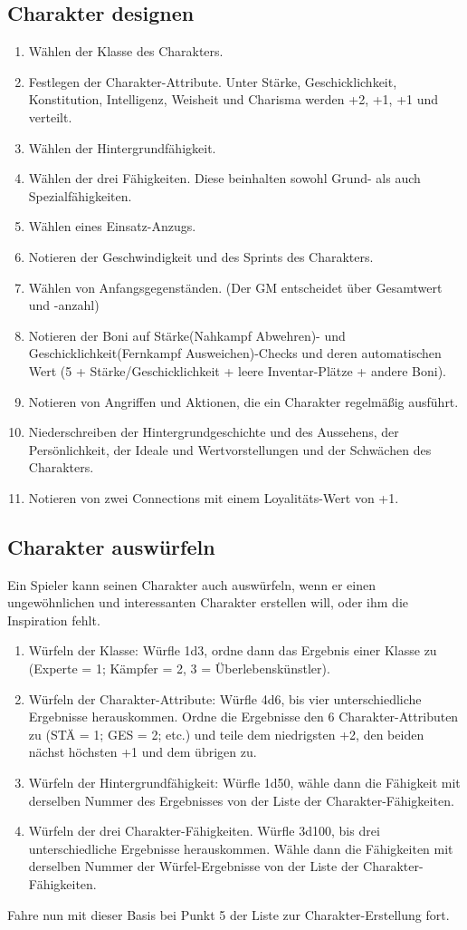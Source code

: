 \subsection{Charakter designen}
\begin{enumerate}
\item Wählen der Klasse des Charakters.
\item Festlegen der Charakter-Attribute. Unter Stärke, Geschicklichkeit, Konstitution, Intelligenz, Weisheit und Charisma werden \glqq +2\grqq{}, \glqq +1\grqq{}, \glqq +1\grqq{} und \grqq{} verteilt.
\item Wählen der Hintergrundfähigkeit.
\item Wählen der drei Fähigkeiten. Diese beinhalten sowohl Grund- als auch Spezialfähigkeiten.
\item Wählen eines Einsatz-Anzugs.
\item Notieren der Geschwindigkeit und des Sprints des Charakters.
\item Wählen von Anfangsgegenständen. (Der GM entscheidet über Gesamtwert und -anzahl)
\item Notieren der Boni auf Stärke(Nahkampf Abwehren)- und Geschicklichkeit(Fernkampf Ausweichen)-Checks und deren automatischen Wert (5 + Stärke/Geschicklichkeit + leere Inventar-Plätze + andere Boni).
\item Notieren von Angriffen und Aktionen, die ein Charakter regelmäßig ausführt.
\item Niederschreiben der Hintergrundgeschichte und des Aussehens, der Persönlichkeit, der Ideale und Wertvorstellungen und der Schwächen des Charakters.
\item Notieren von zwei Connections mit einem Loyalitäts-Wert von +1.
\end{enumerate}
\subsection{Charakter auswürfeln}
Ein Spieler kann seinen Charakter auch auswürfeln, wenn er einen ungewöhnlichen und interessanten Charakter erstellen will, oder ihm die Inspiration fehlt.
\begin{enumerate}
\item Würfeln der Klasse: Würfle 1d3, ordne dann das Ergebnis einer Klasse zu (Experte = 1; Kämpfer = 2, 3 = Überlebenskünstler).
\item Würfeln der Charakter-Attribute: Würfle 4d6, bis vier unterschiedliche Ergebnisse herauskommen. Ordne die Ergebnisse den 6 Charakter-Attributen zu (STÄ = 1; GES = 2; etc.) und teile dem niedrigsten \grqq +2\grqq{}, den beiden nächst höchsten \grqq +1\grqq{} und dem übrigen \grqq{} zu.
\item Würfeln der Hintergrundfähigkeit: Würfle 1d50, wähle dann die Fähigkeit mit derselben Nummer des Ergebnisses von der Liste der Charakter-Fähigkeiten.
\item Würfeln der drei Charakter-Fähigkeiten. Würfle 3d100, bis drei unterschiedliche Ergebnisse herauskommen. Wähle dann die Fähigkeiten mit derselben Nummer der Würfel-Ergebnisse von der Liste der Charakter-Fähigkeiten.
\end{enumerate}
Fahre nun mit dieser Basis bei Punkt 5 der Liste zur Charakter-Erstellung fort.

